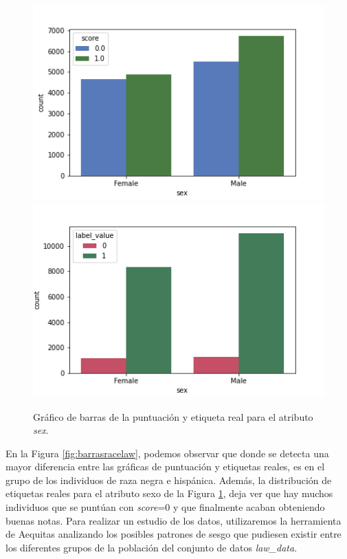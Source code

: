 \begin{figure}[h]
      \includegraphics[width=\linewidth]{images/score_sex_law.png}
    \endminipage\hfill
      \includegraphics[width=\linewidth]{images/label_sex_law.png}
    \endminipage
     \caption{Gráfico de barras de la puntuación y etiqueta real para el atributo \textit{sex}.}
     \label{fig:barrassexlaw}
\end{figure}

En la Figura \ref{fig:barrasracelaw}, podemos observar que donde se detecta una mayor diferencia entre las gráficas de puntuación y etiquetas reales, es en el grupo de los individuos de raza negra e hispánica. Además, la distribución de etiquetas reales para el atributo sexo de la Figura \ref{fig:barrassexlaw}, deja ver que hay muchos individuos que se puntúan con \textit{score}=0 y que finalmente acaban obteniendo buenas notas. Para realizar un estudio de los datos, utilizaremos la herramienta de Aequitas analizando los posibles patrones de sesgo que pudiesen existir entre los diferentes grupos de la población del conjunto de datos \textit{law\_data}.

